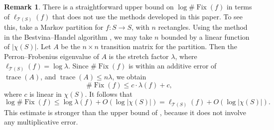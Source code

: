 \documentclass[11pt,letterpaper]{amsart}
\newcommand{\stnote}[1]{\todo[color=blue!30,linecolor=blue!80!black,size= \footnotesize]{#1}}
\newcommand{\mc}{\mathcal}
\newcommand{\teich}{\mathcal T}
\newcommand{\Fix}{\operatorname{Fix}}
\numberwithin{equation}{section}
\theoremstyle{definition}
\newtheorem{remark}[theorem]{Remark}
\newcommand{\from}{\colon} %
\begin{document}
\begin{remark}\label{Rem:UpperBoundMarkov}
There is a straightforward upper bound on $\log \# \Fix(f)$ in terms of $\ell_{\teich(S)}(f)$ that does not use the methods developed in this paper. To see this, take a Markov partition for $f\colon S \to S$, with $n$ rectangles.  Using the method in the Bestvina--Handel algorithm \cite{besthand}, we may take $n$  bounded by a linear function of $|\chi(S)|$. Let $A$ be the $n \times n$ transition matrix for the partition. Then the Perron--Frobenius eigenvalue of $A$ is the stretch factor $\lambda$, where $ \ell_{\teich(S)}(f) = \log \lambda$. Since $\#\Fix(f)$ is within an additive error of $\operatorname{trace}(A)$, and $\operatorname{trace}(A) \leq n \lambda$, we obtain
\[
\#\Fix(f) \le c \cdot \lambda(f) + c,
\]
where $c$ is linear in $\chi(S)$. It follows that 
\[
\log \#\Fix(f) \leq \log \lambda(f) + O(\log |\chi(S)|) = \ell_{\teich(S)}(f) + O(\log |\chi(S)|).
\]
This estimate is stronger than the upper bound of , because it does not involve any multiplicative error.
\end{remark}


%
\end{document}

